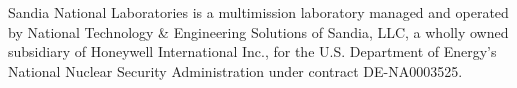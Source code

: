 \noindent
{\tiny Sandia National Laboratories is a multimission laboratory managed and operated by National Technology \& Engineering Solutions of Sandia, LLC, a wholly owned subsidiary of Honeywell International Inc., for the U.S. Department of Energy's National Nuclear Security Administration under contract DE-NA0003525.
\par}

